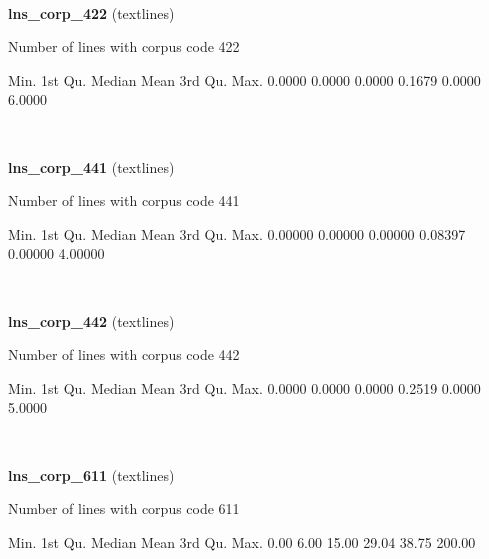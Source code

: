 \documentclass[]{article}
\newenvironment{Shaded}{\begin{snugshade}}{\end{snugshade}}
\newcommand{\FloatTok}[1]{\textcolor[rgb]{0.00,0.00,0.81}{{#1}}}
\newcommand{\NormalTok}[1]{{#1}}
\begin{document}
~

\vspace{1em}

\textbf{lns\_corp\_422} (textlines)

Number of lines with corpus code 422

\begin{Shaded}
\begin{Highlighting}[]
   \NormalTok{Min. 1st Qu.  Median    Mean 3rd Qu.    Max. }
 \FloatTok{0.0000}  \FloatTok{0.0000}  \FloatTok{0.0000}  \FloatTok{0.1679}  \FloatTok{0.0000}  \FloatTok{6.0000} 
\end{Highlighting}
\end{Shaded}

~

\vspace{1em}

\textbf{lns\_corp\_441} (textlines)

Number of lines with corpus code 441

\begin{Shaded}
\begin{Highlighting}[]
   \NormalTok{Min. 1st Qu.  Median    Mean 3rd Qu.    Max. }
\FloatTok{0.00000} \FloatTok{0.00000} \FloatTok{0.00000} \FloatTok{0.08397} \FloatTok{0.00000} \FloatTok{4.00000} 
\end{Highlighting}
\end{Shaded}

~

\vspace{1em}

\textbf{lns\_corp\_442} (textlines)

Number of lines with corpus code 442

\begin{Shaded}
\begin{Highlighting}[]
   \NormalTok{Min. 1st Qu.  Median    Mean 3rd Qu.    Max. }
 \FloatTok{0.0000}  \FloatTok{0.0000}  \FloatTok{0.0000}  \FloatTok{0.2519}  \FloatTok{0.0000}  \FloatTok{5.0000} 
\end{Highlighting}
\end{Shaded}

~

\vspace{1em}

\textbf{lns\_corp\_611} (textlines)

Number of lines with corpus code 611

\begin{Shaded}
\begin{Highlighting}[]
   \NormalTok{Min. 1st Qu.  Median    Mean 3rd Qu.    Max. }
   \FloatTok{0.00}    \FloatTok{6.00}   \FloatTok{15.00}   \FloatTok{29.04}   \FloatTok{38.75}  \FloatTok{200.00} 
\end{Highlighting}
\end{Shaded}
\end{document}
